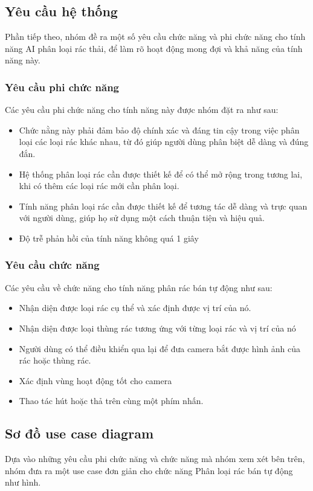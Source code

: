 \subsection{Yêu cầu hệ thống}

Phần tiếp theo, nhóm đề ra một số yêu cầu chức năng và phi chức năng cho tính năng AI phân loại rác thải, để làm rõ hoạt động mong đợi và khả năng của tính năng này.

\subsubsection{Yêu cầu phi chức năng}


Các yêu cầu phi chức năng cho tính năng này được nhóm đặt ra như sau:
\begin{itemize}
    \item Chức nằng này phải đảm bảo độ chính xác và đáng tin cậy trong việc phân loại các loại rác khác nhau, từ đó giúp người dùng phân biệt dễ dàng và đúng đắn.
    \item Hệ thống phân loại rác cần được thiết kế để có thể mở rộng trong tương lai, khi có thêm các loại rác mới cần phân loại.
    \item Tính năng phân loại rác cần được thiết kế để tương tác dễ dàng và trực quan với người dùng, giúp họ sử dụng một cách thuận tiện và hiệu quả.
    \item Độ trễ phản hồi của tính năng không quá 1 giây
\end{itemize}
\subsubsection{Yêu cầu chức năng}
Các yêu cầu về chức năng cho tính năng phân rác bán tự động như sau:
\begin{itemize}
    \item Nhận diện được loại rác cụ thể và xác định được vị trí của nó.
    \item Nhận diện được loại thùng rác tương ứng với từng loại rác và vị trí của nó
    \item Người dùng có thể điều khiển qua lại để đưa camera bắt được hình ảnh của rác hoặc thùng rác.
    \item Xác định vùng hoạt động tốt cho camera
    \item Thao tác hút hoặc thả trên cùng một phím nhấn.
\end{itemize}
\subsection{Sơ đồ use case diagram}
Dựa vào những yêu cầu phi chức năng và chức năng mà nhóm xem xét bên trên, nhóm đưa ra một use case đơn giản cho chức năng Phân loại rác bán tự động như hình.

